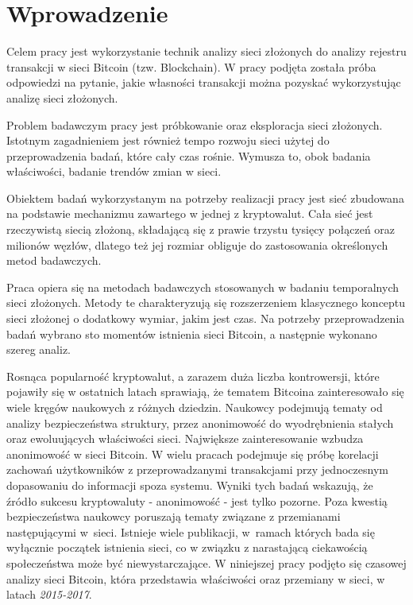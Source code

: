 \documentclass[12pt, oneside, final, openany]{mgr}
\begin{document}
\def\listtablename{Spis tabel. }
\def\tablename{Tabela. }



\tableofcontents
\chapter*{Wprowadzenie}
\vspace{-1ex}
\indent Celem pracy jest wykorzystanie technik analizy sieci złożonych do analizy rejestru transakcji w sieci Bitcoin (tzw. Blockchain). W pracy podjęta została próba odpowiedzi na pytanie, jakie własności transakcji można pozyskać wykorzystując analizę sieci złożonych.

\indent Problem badawczym pracy jest próbkowanie oraz eksploracja sieci złożonych. Istotnym zagadnieniem jest również tempo rozwoju sieci użytej do przeprowadzenia badań, które cały czas rośnie. Wymusza to, obok badania właściwości, badanie trendów zmian w sieci.

\indent Obiektem badań wykorzystanym na potrzeby realizacji pracy jest sieć zbudowana na podstawie mechanizmu zawartego w jednej z kryptowalut. Cała sieć jest rzeczywistą siecią złożoną, składającą się z prawie trzystu tysięcy połączeń oraz milionów węzłów, dlatego też jej rozmiar obliguje do zastosowania określonych metod badawczych.

\indent Praca opiera się na metodach badawczych stosowanych w badaniu temporalnych sieci złożonych. Metody te charakteryzują się rozszerzeniem klasycznego konceptu sieci złożonej o dodatkowy wymiar, jakim jest czas. Na potrzeby przeprowadzenia badań wybrano sto momentów istnienia sieci Bitcoin, a następnie wykonano szereg analiz.

\indent Rosnąca popularność kryptowalut, a zarazem duża liczba kontrowersji, które pojawiły się w ostatnich latach sprawiają, że tematem Bitcoina zainteresowało się wiele kręgów naukowych z różnych dziedzin. Naukowcy podejmują tematy od analizy bezpieczeństwa struktury, przez anonimowość do wyodrębnienia stałych oraz ewoluujących właściwości sieci. Największe zainteresowanie wzbudza anonimowość w sieci Bitcoin. W wielu pracach podejmuje się próbę korelacji zachowań użytkowników z przeprowadzanymi transakcjami przy jednoczesnym dopasowaniu do informacji spoza systemu. Wyniki tych badań wskazują, że źródło sukcesu kryptowaluty - anonimowość - jest tylko pozorne. Poza kwestią bezpieczeństwa naukowcy poruszają tematy związane z przemianami następującymi w~sieci. Istnieje wiele publikacji, w~ramach których bada się wyłącznie początek istnienia sieci, co w związku z narastającą ciekawością społeczeństwa może być niewystarczające. W niniejszej pracy podjęto się czasowej analizy sieci Bitcoin, która przedstawia właściwości oraz przemiany w sieci, w latach \textit{2015-2017}.
\end{document}
